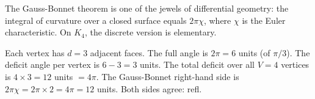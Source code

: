 \documentclass[11pt,a4paper]{book}
\def\texttt#1{#1}%
\begin{document}
The Gauss-Bonnet theorem is one of the jewels of differential geometry: the integral of curvature over a closed surface equals $2\pi\chi$, where $\chi$ is the Euler characteristic. On $K_4$, the discrete version is elementary.

Each vertex has $d = 3$ adjacent faces. The full angle is $2\pi = 6$ units (of $\pi/3$). The deficit angle per vertex is $6 - 3 = 3$ units. The total deficit over all $V = 4$ vertices is $4 \times 3 = 12$ units $= 4\pi$. The Gauss-Bonnet right-hand side is $2\pi\chi = 2\pi \times 2 = 4\pi = 12$ units. Both sides agree: \texttt{refl}.

\begin{code}%
\>[0]\<%
\\
%
\\[\AgdaEmptyExtraSkip]%
\>[0]\<%
\\
\>[0]\AgdaSpace{}%
\AgdaSymbol{:}\AgdaSpace{}%
\<%
\\
\>[0]\AgdaSpace{}%
\AgdaSymbol{=}\AgdaSpace{}%
%
\>[28]\<%
\\
%
\\[\AgdaEmptyExtraSkip]%
\>[0]\<%
\\
\>[0]\AgdaSpace{}%
\AgdaSymbol{:}\AgdaSpace{}%
\<%
\\
\>[0]\AgdaSpace{}%
\AgdaSymbol{=}\AgdaSpace{}%
\AgdaSpace{}%
\AgdaOperator{\AgdaPrimitive{*}}\AgdaSpace{}%
%
\>[32]\<%
\\
%
\\[\AgdaEmptyExtraSkip]%
\>[0]\<%
\\
\>[0]\AgdaSpace{}%
\AgdaSymbol{:}\AgdaSpace{}%
\<%
\\
\>[0]\AgdaSpace{}%
\AgdaSymbol{=}\AgdaSpace{}%
\AgdaSpace{}%
\AgdaSpace{}%
%
\>[53]\<%
\\
%
\\[\AgdaEmptyExtraSkip]%

\end{code}
\end{document}

